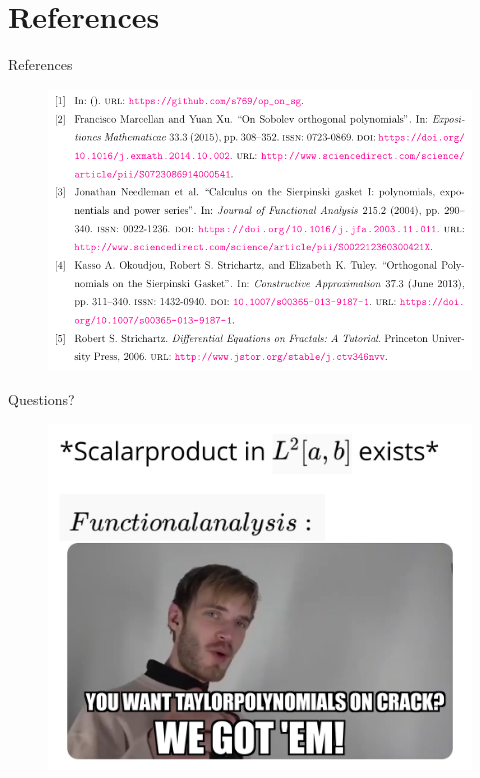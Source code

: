 \documentclass[xcolor = dvipsnames]{beamer}
\begin{document}
\section{References}
\begin{frame}{References}
\begin{figure}
    \centering
    \includegraphics[width=0.95\linewidth]{Final_presentation/images/references.png}
 
    \label{fig:refs}
\end{figure}
\end{frame}
\begin{frame}{Questions?}
    \begin{figure}[H]
        \centering
        \includegraphics[width=.7\textwidth]{images/meme.jpg}
        \label{fig:meme}
    \end{figure}
\end{frame}


\end{document}
